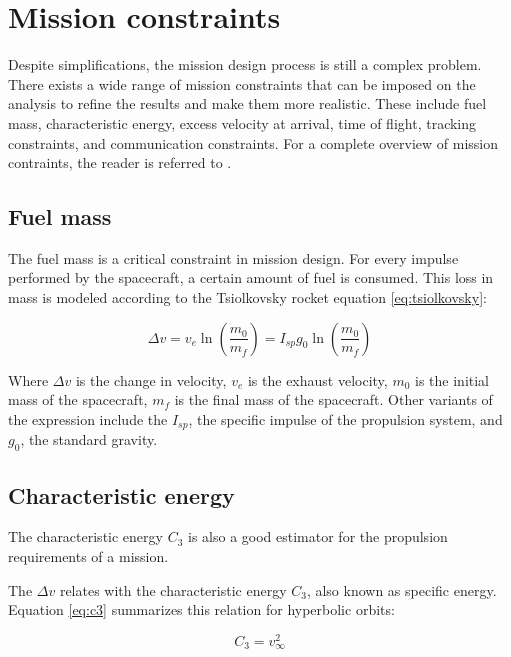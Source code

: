 \section{Mission constraints}


Despite simplifications, the mission design process is still a complex problem.
There exists a wide range of mission constraints that can be imposed on the
analysis to refine the results and make them more realistic. These include fuel
mass, characteristic energy, excess velocity at arrival, time of flight,
tracking constraints, and communication constraints. For a complete overview of
mission contraints, the reader is referred to \cite{smad2011}.

\subsection{Fuel mass}

The fuel mass is a critical constraint in mission design. For every impulse
performed by the spacecraft, a certain amount of fuel is consumed. This loss in
mass is modeled according to the Tsiolkovsky rocket equation \ref{eq:tsiolkovsky}:

\begin{equation}
  \Delta v = v_e \ln \left( \frac{m_0}{m_f} \right) = I_{sp} g_0 \ln \left( \frac{m_0}{m_f} \right)
  \label{eq:tsiolkovsky}
\end{equation}

Where $\Delta v$ is the change in velocity, $v_e$ is the exhaust velocity, $m_0$
is the initial mass of the spacecraft, $m_f$ is the final mass of the
spacecraft. Other variants of the expression include the $I_{sp}$, the specific
impulse of the propulsion system, and $g_0$, the standard gravity.

\subsection{Characteristic energy}

The characteristic energy $C_3$ is also a good estimator for the propulsion
requirements of a mission.

The $\Delta v$ relates with the characteristic energy $C_3$, also known as
specific energy. Equation \ref{eq:c3} summarizes this relation for hyperbolic
orbits:

\begin{equation}
  C_3 = v_{\infty}^2
  \label{eq:c3}
\end{equation}

